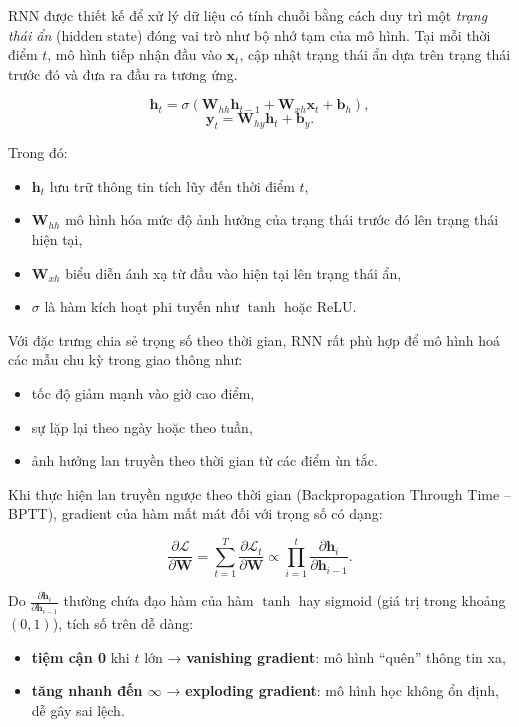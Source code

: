 
RNN được thiết kế để xử lý dữ liệu có tính chuỗi bằng cách duy trì một \textit{trạng thái ẩn} (hidden state) đóng vai trò như bộ nhớ tạm của mô hình. Tại mỗi thời điểm $t$, mô hình tiếp nhận đầu vào $\mathbf{x}_t$, cập nhật trạng thái ẩn dựa trên trạng thái trước đó và đưa ra đầu ra tương ứng.

\[
\mathbf{h}_t = \sigma(\mathbf{W}_{hh}\mathbf{h}_{t-1} + \mathbf{W}_{xh}\mathbf{x}_t + \mathbf{b}_h),
\]
\[
\mathbf{y}_t = \mathbf{W}_{hy}\mathbf{h}_t + \mathbf{b}_y.
\]

Trong đó:
\begin{itemize}
    \item $\mathbf{h}_{t}$ lưu trữ thông tin tích lũy đến thời điểm $t$,
    \item $\mathbf{W}_{hh}$ mô hình hóa mức độ ảnh hưởng của trạng thái trước đó lên trạng thái hiện tại,
    \item $\mathbf{W}_{xh}$ biểu diễn ánh xạ từ đầu vào hiện tại lên trạng thái ẩn,
    \item $\sigma$ là hàm kích hoạt phi tuyến như $\tanh$ hoặc ReLU.
\end{itemize}

Với đặc trưng chia sẻ trọng số theo thời gian, RNN rất phù hợp để mô hình hoá các mẫu chu kỳ trong giao thông như:
\begin{itemize}
    \item tốc độ giảm mạnh vào giờ cao điểm,
    \item sự lặp lại theo ngày hoặc theo tuần,
    \item ảnh hưởng lan truyền theo thời gian từ các điểm ùn tắc.
\end{itemize}


Khi thực hiện lan truyền ngược theo thời gian (Backpropagation Through Time – BPTT), gradient của hàm mất mát đối với trọng số có dạng:

\[
\frac{\partial \mathcal{L}}{\partial \mathbf{W}}
= \sum_{t=1}^T 
\frac{\partial \mathcal{L}_t}{\partial \mathbf{W}}
\propto
\prod_{i=1}^t \frac{\partial \mathbf{h}_i}{\partial \mathbf{h}_{i-1}}.
\]

Do $\frac{\partial \mathbf{h}_i}{\partial \mathbf{h}_{i-1}}$ thường chứa đạo hàm của hàm $\tanh$ hay sigmoid (giá trị trong khoảng $(0, 1)$), tích số trên dễ dàng:
\begin{itemize}
    \item \textbf{tiệm cận 0} khi $t$ lớn → \textbf{vanishing gradient}: mô hình “quên” thông tin xa,
    \item \textbf{tăng nhanh đến $\infty$} → \textbf{exploding gradient}: mô hình học không ổn định, dễ gây sai lệch.
\end{itemize}

